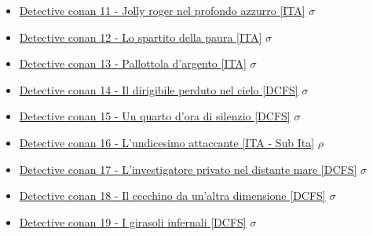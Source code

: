 \begin{itemize}
				\item \href{https://mega.nz/#!4Y1TVSaB!_UtCZTAy-zGZktxlB15xv_k5KFQRcLPg0NBfiLLOLTM} {Detective conan 11 - Jolly roger nel profondo azzurro  [ITA]}  $\sigma$   \\
				\item \href{https://mega.nz/#!oN1mHJQL!wpBNhW-CmaPloL5mvgznb6zbxdaPEAYJAfMkn4hQw1Y} {Detective conan 12 - Lo spartito della paura  [ITA]}  $\sigma$   \\
				\item \href{https://mega.nz/#!1ZMzmIbQ!QtcmEA1EIv3YrIh4qLDLAjZyHIUQaV_cRgvCTgFOly4} {Detective conan 13 - Pallottola d'argento  [ITA]}  $\sigma$   \\
				\item \href{https://mega.nz/#!ZIFCFaDA!0xsJj6RmWTsoZPUQ0dji6MCG-Dq-uPKXluQ5QPBIQ0g} {Detective conan 14 - Il dirigibile perduto nel cielo  [DCFS]}  $\sigma$   \\
				\item \href{https://mega.nz/#!BdchEYpJ!mBV6_YkXYKSnHF62gSgEjLjbZNMMwiA4dRa_EChSXhE} {Detective conan 15 - Un quarto d'ora di silenzio  [DCFS]}  $\sigma$   \\
				\item \href{https://mega.nz/#!AFIUAbgZ!iJ7uZnc94L11A6ZJOG_z3jVSf-dpSTqY3vb8HjquGDY} {Detective conan 16 - L'undicesimo attaccante  [ITA - Sub Ita]}  $\rho$   \\
				\item \href{https://mega.nz/#!4BkBnQoI!hhraZcMOqiP31Uwat75HU1j1zDZMlOW8jNmaYzAwRmI} {Detective conan 17 - L'investigatore privato nel distante mare  [DCFS]}  $\sigma$   \\
				\item \href{https://mega.nz/#!tR1GRa4J!hQDq5MgmIKy5iGHtwSNbgjrq9DwGpVPskDtAqkpdCL4} {Detective conan 18 - Il cecchino da un'altra dimensione  [DCFS]}  $\sigma$   \\
				\item \href{https://mega.nz/#!oAs0QRSK!f1kenAGHV55uK5L0J9uQWzYgVxPaI6fL7f5EF8VU1bk} {Detective conan 19 - I girasoli infernali [DCFS]}  $\sigma$   \\
			
			\end{itemize}
		
